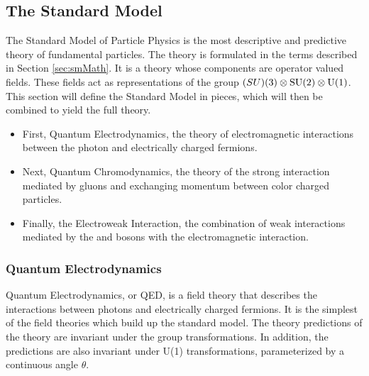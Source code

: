 \subsection{The Standard Model}

The Standard Model of Particle Physics is the most descriptive and predictive theory of fundamental particles.
The theory is formulated in the terms described in Section \ref{sec:smMath}.
It is a theory whose components are operator valued fields.
These fields act as representations of the group $\text(SU)(3)\otimes\text{SU}(2)\otimes\text{U}(1)$.
This section will define the Standard Model in pieces, which will then be combined to yield the full theory.
\begin{itemize}
    \item First, Quantum Electrodynamics, the theory of electromagnetic interactions between the photon and electrically charged fermions.
    \item Next, Quantum Chromodynamics, the theory of the strong interaction mediated by gluons and exchanging momentum between color charged particles.
    \item Finally, the Electroweak Interaction, the combination of weak interactions mediated by the \W and \Z bosons with the electromagnetic interaction.
\end{itemize}

\subsubsection{Quantum Electrodynamics}

Quantum Electrodynamics, or QED, is a field theory that describes the interactions between photons and electrically charged fermions.
It is the simplest of the field theories which build up the standard model.
The theory predictions of the theory are invariant under the \poincare group transformations.
In addition, the predictions are also invariant under U(1) transformations, parameterized by a continuous angle $\theta$.


